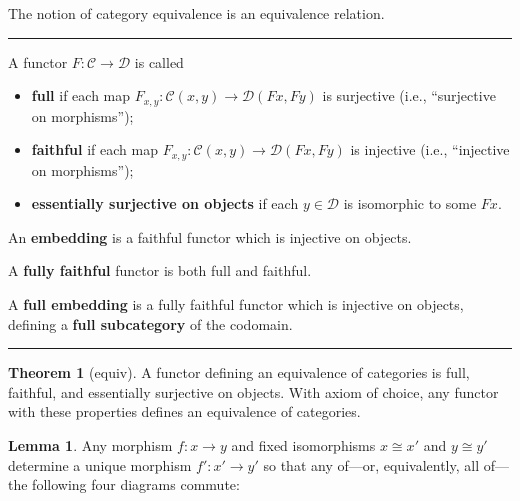 \documentclass[12pt]{article}
\newcommand{\keyword}[1]{\textbf{#1}}
\newcommand{\sepline}{\rule{\textwidth}{0.4pt}}
\theoremstyle{definition}
\newtheorem{theorem}{Theorem}
\newtheorem{lemma}{Lemma}
\newcommand{\CC}{\mathcal{C}}
\newcommand{\DD}{\mathcal{D}}
\newcommand{\<}{\left\langle}
\renewcommand{\>}{\right\rangle}
\newcommand{\iso}{\cong}
\begin{document}
The notion of category equivalence is an equivalence relation.

\sepline

A functor $F : \CC \to \DD$ is called
\begin{itemize}
    \item \keyword{full} if each map $F_{x,y} : \CC(x, y) \to \DD(Fx, Fy)$ is surjective (i.e., ``surjective on morphisms'');
    \item \keyword{faithful} if each map $F_{x,y} : \CC(x, y) \to \DD(Fx, Fy)$ is injective (i.e., ``injective on morphisms'');
    \item \keyword{essentially surjective on objects} if each $y \in \DD$ is isomorphic to some $Fx$.
\end{itemize}

An \keyword{embedding} is a faithful functor which is injective on objects.

A \keyword{fully faithful} functor is both full and faithful.

A \keyword{full embedding} is a fully faithful functor which is injective on objects, defining a \keyword{full subcategory} of the codomain.

\sepline



\begin{theorem}[equiv]
    A functor defining an equivalence of categories is full, faithful, and essentially surjective on objects.
    With axiom of choice, any functor with these properties defines an equivalence of categories.
\end{theorem}

\begin{lemma}
    Any morphism $f : x \to y$ and fixed isomorphisms $x \iso x'$ and $y \iso y'$ determine a unique morphism $f' : x' \to y'$ so that any of---or, equivalently, all of---the following four diagrams commute:
    \begin{center}
        \hspace{1em}
        \hspace{1em}
        \hspace{1em}
    \end{center}
\end{lemma}
\end{document}
